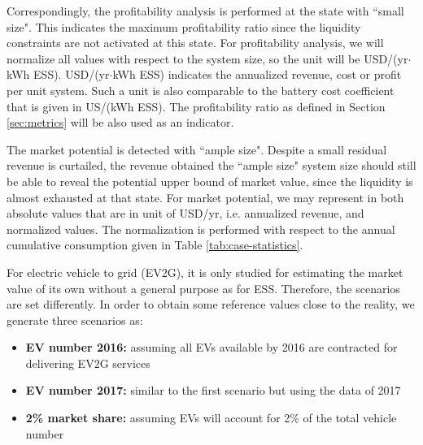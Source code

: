 Correspondingly, the profitability analysis is performed at the state with ``small size". This indicates the maximum profitability ratio since the liquidity constraints are not activated at this state. For profitability analysis, we will normalize all values with respect to the system size, so the unit will be USD/(yr$\cdot$kWh ESS).%
USD/(yr$\cdot$kWh ESS)
indicates the annualized revenue, cost or profit per unit system. Such a unit is also comparable to the battery cost coefficient that is given in US/(kWh ESS). The profitability ratio as defined in Section \ref{sec:metrics} will be also used as an indicator.

The market potential is detected with ``ample size". Despite a small residual revenue is curtailed, the revenue obtained the ``ample size" system size should still be able to reveal the potential upper bound of market value, since the liquidity is almost exhausted at that state. For market potential, we may represent in both absolute values that are in unit of USD/yr, i.e. annualized revenue, and normalized values. The normalization is performed with respect to the annual cumulative consumption given in Table \ref{tab:case-statistics}.

For electric vehicle to grid (EV2G), it is only studied for estimating the market value of its own without a general purpose as for ESS. Therefore, the scenarios are set differently. In order to obtain some reference values close to the reality, we generate three scenarios as:

\begin{itemize}
	\item \textbf{EV number 2016:} assuming all EVs available by 2016 are contracted for delivering EV2G services
	\item \textbf{EV number 2017:} similar to the first scenario but using the data of 2017
	\item \textbf{2\% market share:} assuming EVs will account for 2\% of the total vehicle number
\end{itemize}

